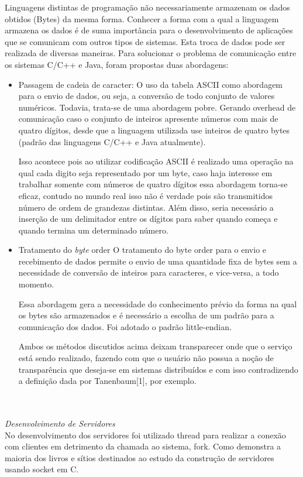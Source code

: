 \documentclass[11pt,twoside]{article}
\begin{document}
Linguagens distintas de programação não necessariamente armazenam os dados obtidos (Bytes) da mesma forma. Conhecer a forma com a qual a linguagem armazena os dados é de suma importância para o desenvolvimento de aplicações que se comunicam com outros tipos de sistemas.
Esta troca de dados pode ser realizada de diversas maneiras. Para solucionar o problema de comunicação entre os sistemas C/C++ e Java, foram propostas duas abordagens:
\begin{itemize}
\item{Passagem de cadeia de caracter:}
O uso da tabela ASCII como abordagem para o envio de dados, ou seja, a conversão de todo conjunto de valores numéricos. Todavia, trata-se de uma abordagem pobre. Gerando overhead de comunicação caso o conjunto de inteiros apresente números com mais de quatro dígitos, desde que a linguagem utilizada use inteiros de quatro bytes (padrão das linguagens C/C++ e Java atualmente).

Isso acontece pois ao utilizar codificação ASCII é realizado uma operação na qual cada digito seja representado por um byte, caso haja interesse em trabalhar somente com números de quatro dígitos essa abordagem torna-se eficaz, contudo no mundo real isso não é verdade pois são transmitidos número de ordem de grandezas distintas. Além disso, seria necessário a inserção de um delimitador entre os dígitos para saber quando começa e quando termina um determinado número.
\item{Tratamento do \textit{byte} order}
O tratamento do byte order para o envio e recebimento de dados permite o envio de uma quantidade fixa de bytes sem a necessidade de conversão de inteiros para caracteres, e vice-versa, a todo momento.

Essa abordagem gera a necessidade do conhecimento prévio da forma na qual os bytes são armazenados e é necessário a escolha de um padrão para a comunicação dos dados. Foi adotado o padrão little-endian.

Ambos os métodos discutidos acima deixam transparecer onde que o serviço está sendo realizado, fazendo com que o usuário não possua a noção de transparência que deseja-se em sistemas distribuídos e com isso contradizendo a definição dada por Tanenbaum[1], por exemplo.
\end{itemize}
\\\\
\textit{\Large{Desenvolvimento de Servidores}}
\\

No desenvolvimento dos servidores foi utilizado thread para realizar a conexão com clientes em detrimento da chamada ao sistema, fork. Como demonstra a maioria dos livros e sítios destinados ao estudo da construção de servidores usando socket em C.
\end{document}
